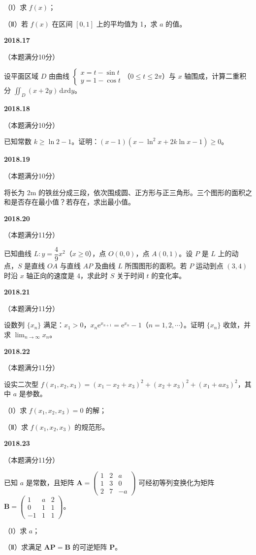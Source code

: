 \documentclass[UTF8,12pt,fontset=windows]{ctexart}
\begin{document}
（Ⅰ）求 $f(x)$；

（Ⅱ）若 $f(x)$ 在区间 $[0,1]$ 上的平均值为 1，求 $a$ 的值。

\vfill
\newpage
{\large\bfseries 2018.17}

（本题满分10分）

设平面区域 $D$ 由曲线 $\begin{cases} x = t - \sin t \\ y = 1 - \cos t \end{cases}$（$0 \leqslant t \leqslant 2\pi$）与 $x$ 轴围成，计算二重积分 $\iint_D (x + 2y)\,\mathrm{d}x\mathrm{d}y$。

\vfill
\newpage
{\large\bfseries 2018.18}

（本题满分10分）

已知常数 $k \geqslant \ln 2 - 1$。证明：$(x-1)(x - \ln^2 x + 2k\ln x - 1) \geqslant 0$。

\vfill
\newpage
{\large\bfseries 2018.19}

（本题满分10分）

将长为 2m 的铁丝分成三段，依次围成圆、正方形与正三角形。三个图形的面积之和是否存在最小值？若存在，求出最小值。

\vfill
\newpage
{\large\bfseries 2018.20}

（本题满分11分）

已知曲线 $L: y = \dfrac{4}{9}x^2$（$x \geqslant 0$），点 $O(0,0)$，点 $A(0,1)$。设 $P$ 是 $L$ 上的动点，$S$ 是直线 $OA$ 与直线 $AP$ 及曲线 $L$ 所围图形的面积。若 $P$ 运动到点 $(3,4)$ 时沿 $x$ 轴正向的速度是 4，求此时 $S$ 关于时间 $t$ 的变化率。

\vfill
\newpage
{\large\bfseries 2018.21}

（本题满分11分）

设数列 $\{x_n\}$ 满足：$x_1 > 0$，$x_n\mathrm{e}^{x_{n+1}} = \mathrm{e}^{x_n} - 1$（$n = 1, 2, \cdots$）。证明 $\{x_n\}$ 收敛，并求 $\lim_{n\to\infty} x_n$。

\vfill
\newpage
{\large\bfseries 2018.22}

（本题满分11分）

设实二次型 $f(x_1, x_2, x_3) = (x_1 - x_2 + x_3)^2 + (x_2 + x_3)^2 + (x_1 + ax_3)^2$，其中 $a$ 是参数。

（Ⅰ）求 $f(x_1, x_2, x_3) = 0$ 的解；

（Ⅱ）求 $f(x_1, x_2, x_3)$ 的规范形。

\vfill
\newpage
{\large\bfseries 2018.23}

（本题满分11分）

已知 $a$ 是常数，且矩阵 $\boldsymbol{A} = \begin{pmatrix} 1 & 2 & a \\ 1 & 3 & 0 \\ 2 & 7 & -a \end{pmatrix}$ 可经初等列变换化为矩阵 $\boldsymbol{B} = \begin{pmatrix} 1 & a & 2 \\ 0 & 1 & 1 \\ -1 & 1 & 1 \end{pmatrix}$。

（Ⅰ）求 $a$；

（Ⅱ）求满足 $\boldsymbol{AP} = \boldsymbol{B}$ 的可逆矩阵 $\boldsymbol{P}$。

\vfill
\end{document}
